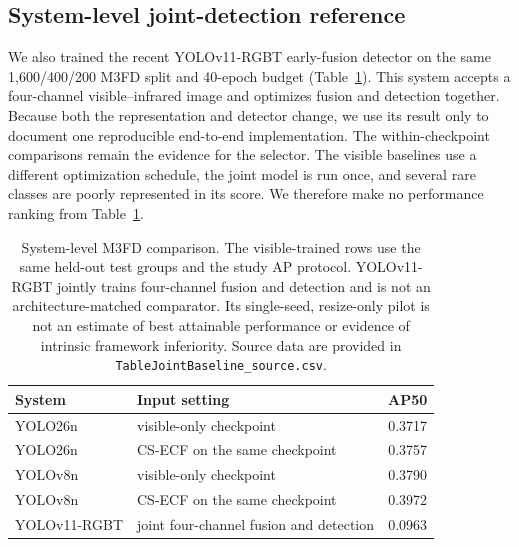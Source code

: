 \documentclass[preprint,11pt]{elsarticle}
\begin{document}
\subsection{System-level joint-detection reference}

We also trained the recent YOLOv11-RGBT early-fusion detector on the same
1,600/400/200 M3FD split and 40-epoch budget
(Table~\ref{tab:joint-baseline}). This system accepts a four-channel
visible--infrared image and optimizes fusion and detection together. Because
both the representation and detector change, we use its result only to
document one reproducible end-to-end implementation. The within-checkpoint
comparisons remain the evidence for the selector. The visible baselines use a
different optimization schedule, the joint model is run once, and several rare
classes are poorly represented in its score. We therefore make no performance
ranking from Table~\ref{tab:joint-baseline}.

\begin{table}[t]
\centering
\small
\caption{System-level M3FD comparison. The visible-trained rows use the same
held-out test groups and the study AP protocol. YOLOv11-RGBT jointly trains
four-channel fusion and detection and is not an architecture-matched
comparator. Its single-seed, resize-only pilot is not an estimate of best
attainable performance or evidence of intrinsic framework inferiority. Source
data are provided in
\texttt{TableJointBaseline\_source.csv}.}
\label{tab:joint-baseline}
\begin{tabular}{@{}llc@{}}
\toprule
System & Input setting & AP50 \\
\midrule
YOLO26n & visible-only checkpoint & 0.3717 \\
YOLO26n & CS-ECF on the same checkpoint & 0.3757 \\
YOLOv8n & visible-only checkpoint & 0.3790 \\
YOLOv8n & CS-ECF on the same checkpoint & 0.3972 \\
YOLOv11-RGBT & joint four-channel fusion and detection & 0.0963 \\
\bottomrule
\end{tabular}
\end{table}
\end{document}
